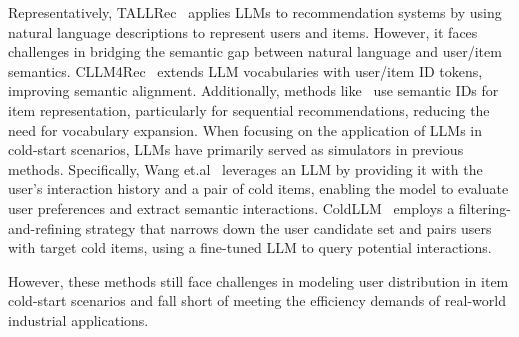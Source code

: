 Representatively, TALLRec~\cite{bao2023tallrec} applies LLMs to recommendation systems by using natural language descriptions to represent users and items. However, it faces challenges in bridging the semantic gap between natural language and user/item semantics. CLLM4Rec~\cite{zhu2024collaborative} extends LLM vocabularies with user/item ID tokens, improving semantic alignment. Additionally, methods like~\cite{rajput2023recommender, jin2023language, zheng2024adapting} use semantic IDs for item representation, particularly for sequential recommendations, reducing the need for vocabulary expansion. When focusing on the application of LLMs in cold-start scenarios, LLMs have primarily served as simulators in previous methods. Specifically, Wang et.al~\cite{wang2024large} leverages an LLM by providing it with the user’s interaction history and a pair of cold items, enabling the model to evaluate user preferences and extract semantic interactions. ColdLLM~\cite{huang2024large} employs a filtering-and-refining strategy that narrows down the user candidate set and pairs users with target cold items, using a fine-tuned LLM to query potential interactions.


However, these methods still face challenges in modeling user distribution in item cold-start scenarios and fall short of meeting the efficiency demands of real-world industrial applications.